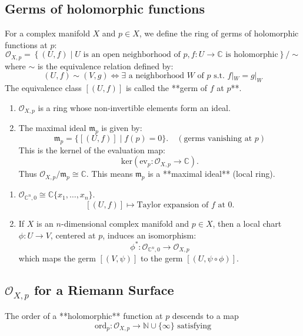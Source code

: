 \documentclass{article}
\begin{document}
\subsection{Germs of holomorphic functions}

\begin{definition}
For a complex manifold $X$ and $p \in X$, we define the ring of germs of holomorphic functions at $p$:
$$
\mathcal{O}_{X, p} = \left\{ (U, f) \mid U \text{ is an open neighborhood of } p, f: U \to \mathbb{C} \text{ is holomorphic} \right\} / \sim
$$
where $\sim$ is the equivalence relation defined by:
$$
(U, f) \sim (V, g) \iff \exists \text{ a neighborhood } W \text{ of } p \text{ s.t. } f|_W = g|_W
$$
The equivalence class $[(U, f)]$ is called the **germ of $f$ at $p$**.
\end{definition}

\begin{remark}
\begin{enumerate}
    \item $\mathcal{O}_{X, p}$ is a ring whose non-invertible elements form an ideal.
    \item The maximal ideal $\mathfrak{m}_p$ is given by:
    $$
    \mathfrak{m}_p = \{ [(U, f)] \mid f(p) = 0 \}. \quad (\text{germs vanishing at } p)
    $$
    This is the kernel of the evaluation map:
    $$
    \text{ker}(\text{ev}_p: \mathcal{O}_{X, p} \to \mathbb{C}).
    $$
    Thus $\mathcal{O}_{X, p} / \mathfrak{m}_p \cong \mathbb{C}$. This means $\mathfrak{m}_p$ is a **maximal ideal** (local ring).
\end{enumerate}
\end{remark}

\begin{example}
\begin{enumerate}
    \item $\mathcal{O}_{\mathbb{C}^n, 0} \cong \mathbb{C} \{x_1, \dots, x_n\}$.
    $$
    [(U, f)] \mapsto \text{Taylor expansion of } f \text{ at } 0.
    $$
    \item If $X$ is an $n$-dimensional complex manifold and $p \in X$, then a local chart $\phi: U \to V$, centered at $p$, induces an isomorphism:
    $$
    \phi^*: \mathcal{O}_{\mathbb{C}^n, 0} \to \mathcal{O}_{X, p}
    $$
    which maps the germ $[(V, \psi)]$ to the germ $[(U, \psi \circ \phi)]$.
\end{enumerate}
\end{example}

\subsection{$\mathcal{O}_{X, p}$ for a Riemann Surface}
The order of a **holomorphic** function at $p$ descends to a map
$$
\text{ord}_p: \mathcal{O}_{X, p} \to \mathbb{N} \cup \{\infty\} \text{ satisfying}
$$
\end{document}
